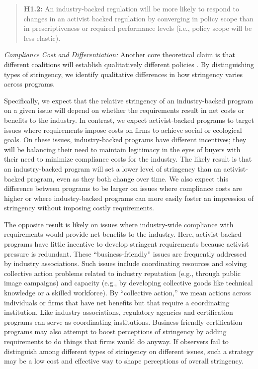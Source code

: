 \documentclass[
      12pt,
            Review ]{article}
\begin{document}
\begin{quote}
\textbf{H1.2:} An industry-backed regulation will be more likely to respond to changes in an activist backed regulation by converging in policy scope than in prescriptiveness or required performance levels (i.e., policy scope will be less elastic).
\end{quote}

\emph{Compliance Cost and Differentiation:} Another core theoretical claim is that different coalitions will establish qualitatively different policies \citep{Botzem2012, Hsueh2012}. By distinguishing types of stringency, we identify qualitative differences in how stringency varies across programs.

Specifically, we expect that the relative stringency of an industry-backed program on a given issue will depend on whether the requirements result in net costs or benefits to the industry. In contrast, we expect activist-backed programs to target issues where requirements impose costs on firms to achieve social or ecological goals. On these issues, industry-backed programs have different incentives; they will be balancing their need to maintain legitimacy in the eyes of buyers with their need to minimize compliance costs for the industry. The likely result is that an industry-backed program will set a lower level of stringency than an activist-backed program, even as they both change over time. We also expect this difference between programs to be larger on issues where compliance costs are higher or where industry-backed programs can more easily foster an impression of stringency without imposing costly requirements.

The opposite result is likely on issues where industry-wide compliance with requirements would provide net benefits to the industry. Here, activist-backed programs have little incentive to develop stringent requirements because activist pressure is redundant. These ``business-friendly'' issues are frequently addressed by industry associations. Such issues include coordinating resources and solving collective action problems related to industry reputation (e.g., through public image campaigns) and capacity (e.g., by developing collective goods like technical knowledge or a skilled workforce). By ``collective action,'' we mean actions across individuals or firms that have net benefits but that require a coordinating institution. Like industry associations, regulatory agencies and certification programs can serve as coordinating institutions. Business-friendly certification programs may also attempt to boost perceptions of stringency by adding requirements to do things that firms would do anyway. If observers fail to distinguish among different types of stringency on different issues, such a strategy may be a low cost and effective way to shape perceptions of overall stringency.
\end{document}
